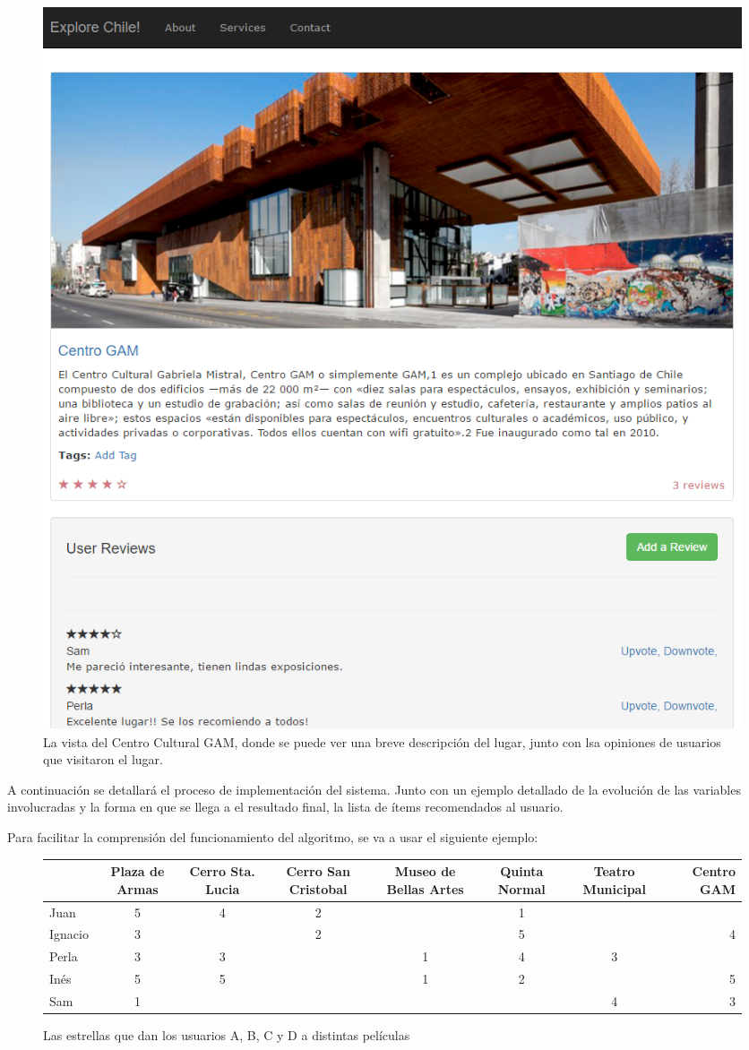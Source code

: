 \begin{figure}[hbtp]
\centering
\includegraphics[scale=0.7]{images/screen1.png}
\caption{La vista del Centro Cultural GAM, donde se puede ver una breve descripción del lugar, junto con lsa opiniones de usuarios que visitaron el lugar.}
\end{figure}  




A continuación se detallará el proceso de implementación del sistema. Junto con un ejemplo detallado de la evolución de las variables involucradas y la forma en que se llega a el resultado final, la lista de ítems recomendados al usuario.

Para facilitar la comprensión del funcionamiento del algoritmo, se va a usar el siguiente ejemplo:

\begin{figure}
\centering
\begin{adjustbox}{max width=\textwidth}
\begin{tabular}{l*{6}{c}r}
                  & Plaza de Armas & Cerro Sta. Lucia & Cerro San Cristobal & Museo de Bellas Artes & Quinta Normal  & Teatro Municipal & Centro GAM \\
\hline
Juan          & 5 & 4 & 2 &   & 1 &   &   \\
\hline
Ignacio       & 3 &   & 2 &   & 5 &   & 4 \\
\hline
Perla         & 3 & 3 &   & 1 & 4 & 3 &   \\
\hline
Inés          & 5 & 5 &   & 1 & 2 &   & 5 \\
\hline
Sam          & 1 &  &   &  &  & 4  & 3 \\


\end{tabular}
\end{adjustbox}
\caption{Las estrellas que dan los usuarios A, B, C y D a distintas películas} 

\end{figure}

